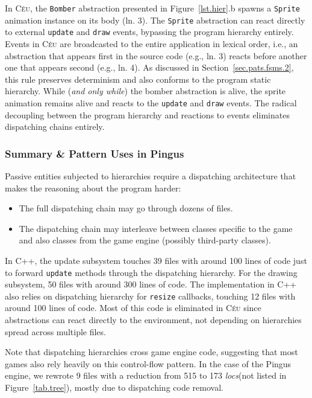 \documentclass{vgtc}                          %
\newcommand{\CEU}{\textsc{C\'{e}u}\xspace}
\newcommand{\locs}{\emph{locs}\xspace}
\newcommand{\code}[1] {{\small{\texttt{#1}}}}
\begin{document}
In \CEU, the \code{Bomber} abstraction presented in Figure~\ref{lst.hier}.b
spawns a \code{Sprite} animation instance on its body (ln. 3).
%
The \code{Sprite} abstraction can react directly to external \code{update}
and \code{draw} events, bypassing the program hierarchy entirely.
Events in \CEU are broadcasted to the entire application in lexical order,
i.e., an abstraction that appears first in the source code (e.g., ln. 3) reacts
before another one that appears second (e.g., ln. 4).
As discussed in Section~\ref{sec.pats.fsms.2}, this rule preserves determinism
and also conforms to the program static hierarchy.
While (\emph{and only while}) the bomber abstraction is alive, the sprite
animation remains alive and reacts to the \code{update} and \code{draw} events.
The radical decoupling between the program hierarchy and reactions to events
eliminates dispatching chains entirely.

\subsubsection{Summary \& Pattern Uses in Pingus}

Passive entities subjected to hierarchies require a dispatching architecture
that makes the reasoning about the program harder:

\begin{itemize}
\item The full dispatching chain may go through dozens of files.
\item The dispatching chain may interleave between classes specific to the game
      and also classes from the game engine (possibly third-party classes).
\end{itemize}

In C++, the update subsystem touches 39 files with around 100 lines of code
just to forward \code{update} methods through the dispatching hierarchy.
For the drawing subsystem, 50 files with around 300 lines of code.
The implementation in C++ also relies on dispatching hierarchy for
\code{resize} callbacks, touching 12 files with around 100 lines of code.
%
Most of this code is eliminated in \CEU since abstractions can react directly
to the environment, not depending on hierarchies spread across multiple files.

Note that dispatching hierarchies cross game engine code, suggesting that most
games also rely heavily on this control-flow pattern.
In the case of the Pingus engine, we rewrote 9 files with a reduction from 515
to 173 \locs (not listed in Figure~\ref{tab.tree}), mostly due to dispatching
code removal.
\end{document}
